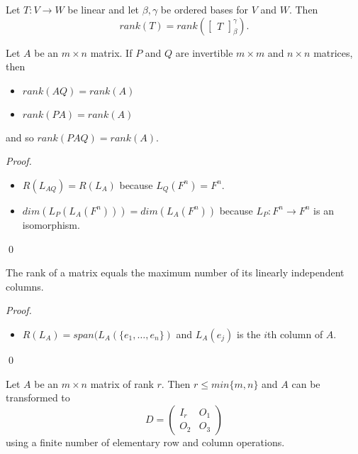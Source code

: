 \documentclass[12pt]{article}
\newenvironment{theorem}[2][Theorem]{\begin{trivlist}
\item[\hskip \labelsep {\bfseries #1}\hskip \labelsep {\bfseries #2.}]}{\end{trivlist}}
\newenvironment{sol}
    {\emph{Proof.}
    }
    {
    \qed
    }
\begin{document}
\begin{theorem}{3.3}
Let $T : V \to W$ be linear and let $\beta, \gamma$ be ordered bases for $V$ and $W$. Then $$rank(T) = rank(\begin{bmatrix} T \end{bmatrix}_{\beta}^\gamma).$$
\end{theorem}

\begin{theorem}{3.4}
Let $A$ be an $m \times n$ matrix. If $P$ and $Q$ are invertible $m \times m$ and $n \times n$ matrices, then 

\begin{itemize}
    \item $rank(AQ) = rank(A)$
    
    \item $rank(PA) = rank(A)$
\end{itemize}
and so $rank(PAQ) = rank(A)$.
\end{theorem}

\begin{sol}
\begin{itemize}
    \item $R(L_{AQ}) = R(L_A)$ because $L_Q(F^n) = F^n$.
    
    \item $dim(L_P(L_A(F^n))) = dim(L_A(F^n))$ because $L_P : F^n \to F^n$ is an isomorphism.
\end{itemize}
\end{sol}

\begin{theorem}{3.5}
The rank of a matrix equals the maximum number of its linearly independent columns.
\end{theorem}

\begin{sol}
\begin{itemize}
    \item $R(L_A) = span(L_A (\{e_1, \dots, e_n\})$ and $L_A(e_j)$ is the $i$th column of $A$.
\end{itemize}
\end{sol}

\begin{theorem}{3.6}
Let $A$ be an $m \times n$ matrix of rank $r$. Then $r \leq min\{m, n\}$ and $A$ can be transformed to $$D = \begin{pmatrix}
I_r & O_1 \\
O_2 & O_3
\end{pmatrix}$$ using a finite number of elementary row and column operations.
\end{theorem}
\end{document}
